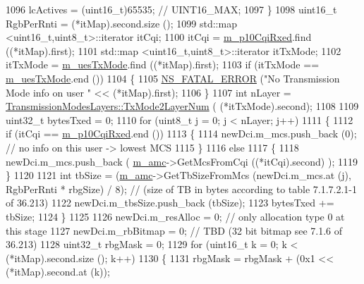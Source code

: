 \begin{DoxyCode}
1096           lcActives = (uint16\_t)65535; \textcolor{comment}{// UINT16\_MAX;}
1097         \}
1098       uint16\_t RgbPerRnti = (*itMap).second.size ();
1099       std::map <uint16\_t,uint8\_t>::iterator itCqi;
1100       itCqi = \hyperlink{classns3_1_1TdBetFfMacScheduler_a30205ddb38c83dab20b1c059df052679}{m\_p10CqiRxed}.find ((*itMap).first);
1101       std::map <uint16\_t,uint8\_t>::iterator itTxMode;
1102       itTxMode = \hyperlink{classns3_1_1TdBetFfMacScheduler_a4488d2d9dc706b42ef06e493332042cd}{m\_uesTxMode}.find ((*itMap).first);
1103       \textcolor{keywordflow}{if} (itTxMode == \hyperlink{classns3_1_1TdBetFfMacScheduler_a4488d2d9dc706b42ef06e493332042cd}{m\_uesTxMode}.end ())
1104         \{
1105           \hyperlink{group__fatal_ga5131d5e3f75d7d4cbfd706ac456fdc85}{NS\_FATAL\_ERROR} (\textcolor{stringliteral}{"No Transmission Mode info on user "} << (*itMap).first);
1106         \}
1107       \textcolor{keywordtype}{int} nLayer = \hyperlink{classns3_1_1TransmissionModesLayers_a31f608b7bfaa77440fe4cb85ad035329}{TransmissionModesLayers::TxMode2LayerNum} (
      (*itTxMode).second);
1108 
1109       uint32\_t bytesTxed = 0;
1110       \textcolor{keywordflow}{for} (uint8\_t j = 0; j < nLayer; j++)
1111         \{
1112           \textcolor{keywordflow}{if} (itCqi == \hyperlink{classns3_1_1TdBetFfMacScheduler_a30205ddb38c83dab20b1c059df052679}{m\_p10CqiRxed}.end ())
1113             \{
1114               newDci.m\_mcs.push\_back (0); \textcolor{comment}{// no info on this user -> lowest MCS}
1115             \}
1116           \textcolor{keywordflow}{else}
1117             \{
1118               newDci.m\_mcs.push\_back ( \hyperlink{classns3_1_1TdBetFfMacScheduler_a3ba724ed3776a6cb493df6dd91b810d6}{m\_amc}->GetMcsFromCqi ((*itCqi).second) );
1119             \}
1120 
1121           \textcolor{keywordtype}{int} tbSize = (\hyperlink{classns3_1_1TdBetFfMacScheduler_a3ba724ed3776a6cb493df6dd91b810d6}{m\_amc}->GetTbSizeFromMcs (newDci.m\_mcs.at (j), RgbPerRnti * rbgSize) / 8); \textcolor{comment}{//
       (size of TB in bytes according to table 7.1.7.2.1-1 of 36.213)}
1122           newDci.m\_tbsSize.push\_back (tbSize);
1123           bytesTxed += tbSize;
1124         \}
1125 
1126       newDci.m\_resAlloc = 0;  \textcolor{comment}{// only allocation type 0 at this stage}
1127       newDci.m\_rbBitmap = 0; \textcolor{comment}{// TBD (32 bit bitmap see 7.1.6 of 36.213)}
1128       uint32\_t rbgMask = 0;
1129       \textcolor{keywordflow}{for} (uint16\_t k = 0; k < (*itMap).second.size (); k++)
1130         \{
1131           rbgMask = rbgMask + (0x1 << (*itMap).second.at (k));

\end{DoxyCode}

